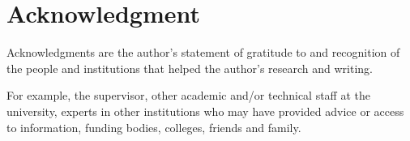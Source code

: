 %
%
%
%

\chapter*{Acknowledgment}
\label{chap:acknowledgment}

Acknowledgments are the author's statement of gratitude to and recognition of the people and institutions that helped the author's research and writing.

For example, the supervisor, other academic and/or technical staff at the university, experts in other institutions who may have provided advice or access to information, funding bodies, colleges, friends and family.

%

